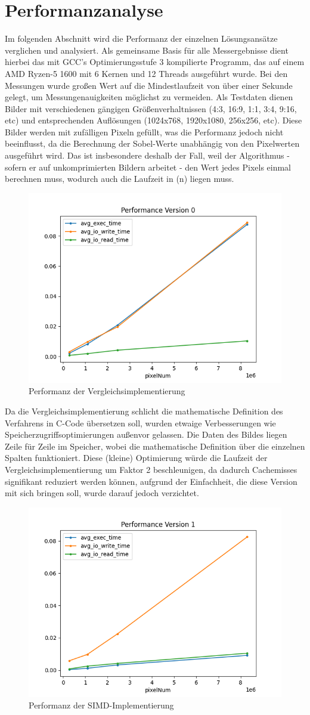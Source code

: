 \documentclass[course=erap]{aspdoc}
\begin{document}
\section{Performanzanalyse}\label{sec:performanzanalyse}
Im folgenden Abschnitt wird die Performanz der einzelnen Lösungsansätze verglichen und analysiert.
Als gemeinsame Basis für alle Messergebnisse dient hierbei das mit GCC's Optimierungsstufe 3 kompilierte Programm, das auf einem AMD Ryzen-5 1600 mit 6 Kernen und 12 Threads ausgeführt wurde.
Bei den Messungen wurde großen Wert auf die Mindestlaufzeit von über einer Sekunde gelegt, um Messungenauigkeiten möglichst zu vermeiden.
Als Testdaten dienen Bilder mit verschiedenen gängigen Größenverhaltnissen (4:3, 16:9, 1:1, 3:4, 9:16, etc) und entsprechenden Auflösungen (1024x768, 1920x1080, 256x256, etc).
Diese Bilder werden mit zufälligen Pixeln gefüllt, was die Performanz jedoch nicht beeinflusst, da die Berechnung der Sobel-Werte unabhängig von den Pixelwerten ausgeführt wird.
Das ist insbesondere deshalb der Fall, weil der Algorithmus - sofern er auf unkomprimierten Bildern arbeitet - den Wert jedes Pixels einmal berechnen muss, wodurch auch die Laufzeit in (n) liegen muss.
\begin{figure}[H]
    \centering
    \includegraphics[width=0.5\columnwidth]{graphics/performance_vergleich}
    \caption{Performanz der Vergleichsimplementierung}
    \label{fig:performanz}
\end{figure}
Da die Vergleichsimplementierung schlicht die mathematische Definition des Verfahrens in C-Code übersetzen soll, wurden etwaige Verbesserungen wie Speicherzugriffsoptimierungen außenvor gelassen.
Die Daten des Bildes liegen Zeile für Zeile im Speicher, wobei die mathematische Definition über die einzelnen Spalten funktioniert.
Diese (kleine) Optimierung würde die Laufzeit der Vergleichsimplementierung um Faktor 2 beschleunigen, da dadurch Cachemisses signifikant reduziert werden können, aufgrund der Einfachheit, die diese Version mit sich bringen soll, wurde darauf jedoch verzichtet.
\begin{figure}[H]
    \centering
    \includegraphics[width=0.5\columnwidth]{graphics/performance_simd}
    \caption{Performanz der SIMD-Implementierung}
    \label{fig:performanz-simd}
\end{figure}
\end{document}
